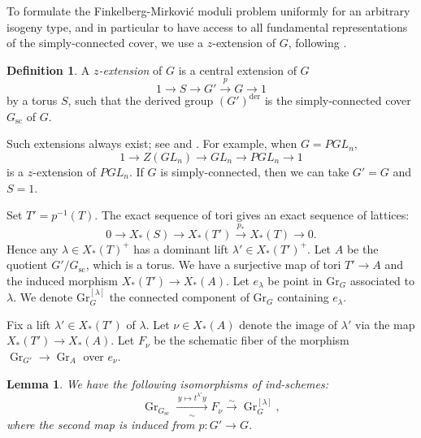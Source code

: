 \documentclass[a4paper, 12pt]{amsart}
\newtheorem{lemma}[theorem]{Lemma}
\theoremstyle{definition}
\newtheorem{definition}[theorem]{Definition}
\DeclareMathOperator{\Gr}{\mathrm{Gr}}
\begin{document}
To formulate the Finkelberg-Mirkovi\'c moduli problem uniformly for an
arbitrary isogeny type, and in particular to have access to all
fundamental representations of the simply-connected cover, we use a
$z$-extension of $G$, following \cite{ZhuPCMI,KPZ}.

\begin{definition}
A \emph{$z$-extension} of $G$  is a central extension of $G$ 
\begin{equation}\label{eq:zfm-extension}
1\to S\to G'\xrightarrow{p}G\to 1
\end{equation}
by a torus $S$,  such that the derived group $(G')^{\mathrm{der}}$ is the simply-connected cover  $G_{\mathrm{sc}}$ of $G$.
\end{definition}
Such extensions always exist; see \cite[Proposition~3.1]{MS} and \cite[\S4.2.4]{KPZ}. For example, when $G=PGL_n$,  \[1\to Z(GL_n)\to GL_n\to PGL_n\to 1\] is a $z$-extension of $PGL_n$. If $G$ is simply-connected, then we can take $G'=G$ and $S=1$. 

Set $T'=p^{-1}(T)$. The exact sequence of  tori gives an exact sequence of lattices: 
\[
0\to X_*(S)\to X_*(T')
\xrightarrow{p_*}X_*(T)\to 0.
\]
Hence any $\lambda\in X_*(T)^+$ has a dominant lift
$\lambda'\in X_*(T')^+$. Let $A$ be the quotient $G'/G_{\mathrm{sc}}$, which is a torus.  We have a surjective map of tori $T'\to A$ and the induced morphism $X_*(T')\to X_*(A)$. Let $e_\lambda$ be point in $\mathrm{Gr}_G$ associated to $\lambda$.  We denote $\mathrm{Gr}_G^{[\lambda]}$ the connected component of $\mathrm{Gr}_G$ containing $e_{\lambda}$.  

Fix a lift $\lambda'\in X_*(T')$ of $\lambda$. Let $\nu\in X_*(A)$ denote the image of $\lambda'$ via the map $X_*(T')\to X_*(A)$. Let $F_\nu$ be the schematic fiber of the morphism $\Gr_{G'}\to \Gr_A$ over $e_\nu$.  \begin{lemma}\label{lem:comp}
We have the following isomorphisms of ind-schemes:
\[
\Gr_{G_{\mathrm{sc}}}
\xrightarrow[\sim]{\,y\mapsto t^{\lambda'}y\,}   F_\nu  \xrightarrow{\sim}
\Gr_G^{[\lambda]},
\]
where the second map is induced from $p:G'\to G$.
\end{lemma}
\end{document}
